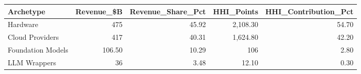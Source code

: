 

\begin{tabular}{@{}lrrrr@{}}
\toprule
Archetype & Revenue\_\$B & Revenue\_Share\_Pct & HHI\_Points & HHI\_Contribution\_Pct \\
\midrule
Hardware & 475 & 45.92 & 2,108.30 & 54.70 \\
Cloud Providers & 417 & 40.31 & 1,624.80 & 42.20 \\
Foundation Models & 106.50 & 10.29 & 106 & 2.80 \\
LLM Wrappers & 36 & 3.48 & 12.10 & 0.30 \\
\bottomrule
\end{tabular}